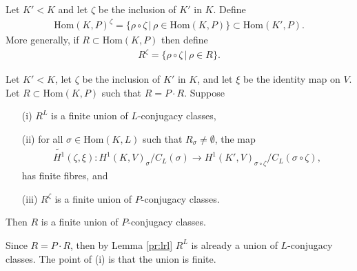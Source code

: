 \begin{definition} Let $K' < K$ and let $\zeta$ be the inclusion of $K'$ in $K$. Define
	\begin{align*}
		\mathrm{Hom}(K, P)^\zeta = \{ \rho\circ\zeta \,|\, \rho \in \mathrm{Hom}(K, P)\} \subset \mathrm{Hom}(K', P).
	\end{align*}
	More generally, if $R \subset \mathrm{Hom}(K, P)$ then define
	\begin{align*}
		R^\zeta = \{\rho\circ\zeta \,|\, \rho \in R\}.
	\end{align*}
\end{definition}

\begin{theorem}\label{main_thm} Let $K'<K$, let $\zeta$ be the inclusion of $K'$ in $K$, and let $\xi$ be the identity map on $V$. Let $R \subset \mathrm{Hom}(K, P)$ such that $R = P \cdot R$. Suppose
	\begin{itemize}
		\item[(i)] $R^L$ is a finite union of $L$-conjugacy classes,
		\item[(ii)] for all $\sigma \in \mathrm{Hom}(K, L)$ such that $R_\sigma \neq \emptyset$, the map
			\begin{align*}
				\widetilde{H^1}(\zeta, \xi):H^1(K, V)_\sigma/C_L(\sigma) \rightarrow H^1(K', V)_{\sigma\circ\zeta}/C_L(\sigma\circ\zeta),
			\end{align*}
			has finite fibres, and
		\item[(iii)] $R^\zeta$ is a finite union of $P$-conjugacy classes.
	\end{itemize}
	Then $R$ is a finite union of $P$-conjugacy classes.
\end{theorem}
\begin{remark}
	Since $R = P \cdot R$, then by Lemma \ref{pr:lrl} $R^L$ is already a union of $L$-conjugacy classes. The point of (i) is that the union is finite.
\end{remark}
